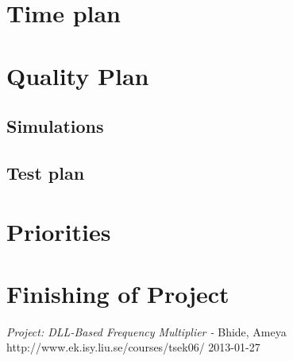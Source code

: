 \documentclass[a4paper,12pt]{article}
\begin{document}
\section{Time plan}

\section{Quality Plan}
\subsection{Simulations}
\subsection{Test plan}

\section{Priorities}

\section{Finishing of Project}

\newpage
\appendix

\newpage


\begin{thebibliography}{99}
\textit{Project: DLL-Based Frequency Multiplier - } Bhide, Ameya
\\ http://www.ek.isy.liu.se/courses/tsek06/ 2013-01-27
\end{thebibliography}
\end{document}
